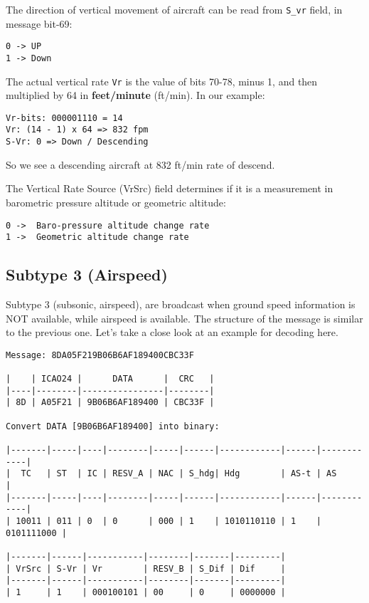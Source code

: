 The direction of vertical movement of aircraft can be read from
\texttt{S\_vr} field, in message bit-69:

\begin{verbatim}
0 -> UP
1 -> Down
\end{verbatim}

The actual vertical rate \texttt{Vr} is the value of bits 70-78, minus
1, and then multiplied by 64 in \textbf{feet/minute} (ft/min). In our
example:

\begin{verbatim}
Vr-bits: 000001110 = 14
Vr: (14 - 1) x 64 => 832 fpm
S-Vr: 0 => Down / Descending
\end{verbatim}

So we see a descending aircraft at 832 ft/min rate of descend.

The Vertical Rate Source (VrSrc) field determines if it is a measurement
in barometric pressure altitude or geometric altitude:

\begin{verbatim}
0 ->  Baro-pressure altitude change rate
1 ->  Geometric altitude change rate
\end{verbatim}

\subsection{Subtype 3 (Airspeed)}\label{subtype-3-airspeed}

Subtype 3 (subsonic, airspeed), are broadcast when ground speed
information is NOT available, while airspeed is available. The structure
of the message is similar to the previous one. Let's take a close look
at an example for decoding here.

\begin{verbatim}
Message: 8DA05F219B06B6AF189400CBC33F

|    | ICAO24 |      DATA      |  CRC   |
|----|--------|----------------|--------|
| 8D | A05F21 | 9B06B6AF189400 | CBC33F |

Convert DATA [9B06B6AF189400] into binary:

|-------|-----|----|--------|-----|------|------------|------|------------|
|  TC   | ST  | IC | RESV_A | NAC | S_hdg| Hdg        | AS-t | AS         |
|-------|-----|----|--------|-----|------|------------|------|------------|
| 10011 | 011 | 0  | 0      | 000 | 1    | 1010110110 | 1    | 0101111000 |

|-------|------|-----------|--------|-------|---------|
| VrSrc | S-Vr | Vr        | RESV_B | S_Dif | Dif     |
|-------|------|-----------|--------|-------|---------|
| 1     | 1    | 000100101 | 00     | 0     | 0000000 |
\end{verbatim}

